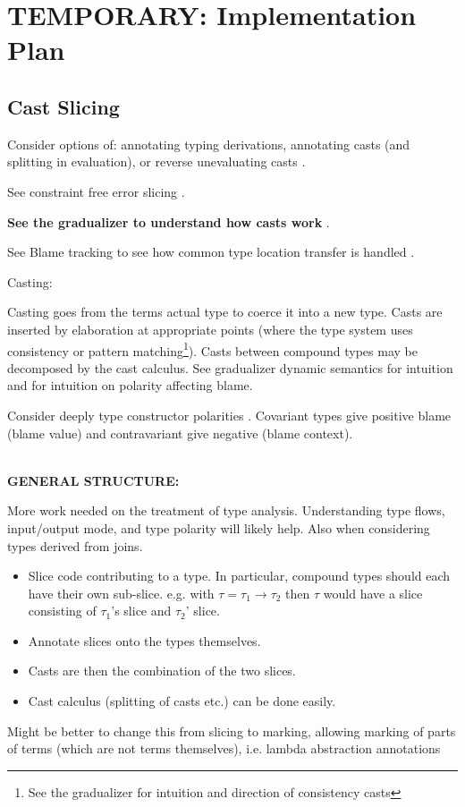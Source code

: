 \chapter{TEMPORARY: Implementation Plan}
\section{Cast Slicing}
Consider options of: annotating typing derivations, annotating casts (and splitting in evaluation), or reverse unevaluating casts \cite{FunctionalProgExplain}.\par
See constraint free error slicing \cite{ConstraintFreeErrSlice}.\par
\textbf{See the gradualizer to understand how casts work }\cite{Gradualizer}.\par
See Blame tracking to see how common type location transfer is handled \cite{Blame}.\\ \par
Casting:\par 
Casting goes from the terms actual type to coerce it into a new type. Casts are inserted by elaboration at appropriate points (where the type system uses consistency or pattern matching\footnote{See the gradualizer for intuition and direction of consistency casts}). Casts between compound types may be decomposed by the cast calculus. See gradualizer dynamic semantics \cite{GradualizerDynamic} for intuition and \cite{Blame} for intuition on polarity affecting blame. \par 
Consider deeply type constructor polarities \cite[pg.473]{TAPL}. Covariant types give positive blame (blame value) and contravariant give negative (blame context).

\\
\textbf{GENERAL STRUCTURE:}\par 
More work needed on the treatment of type analysis. Understanding type flows, input/output mode, and type polarity will likely help. Also when considering types derived from joins.
\begin{itemize}
\item Slice code contributing to a type. In particular, compound types should each have their own sub-slice. e.g. with $\tau = \tau_1 \to \tau_2$ then $\tau$ would have a slice consisting of $\tau_1$'s slice and $\tau_2$' slice.
\item Annotate slices onto the types themselves.
\item Casts are then the combination of the two slices. 
\item Cast calculus (splitting of casts etc.) can be done easily.
\end{itemize}
Might be better to change this from slicing to marking, allowing marking of parts of terms (which are not terms themselves), i.e. lambda abstraction annotations

